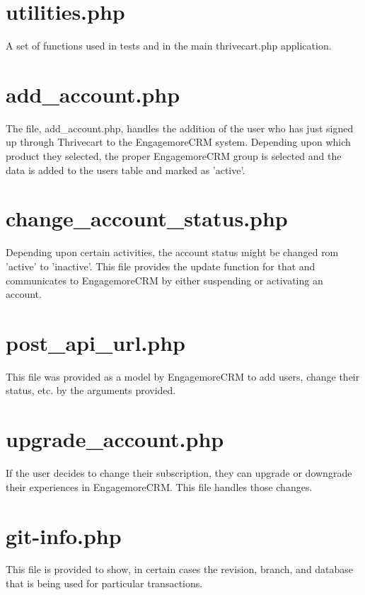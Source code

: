 \documentclass[final,letterpaper,12pt]{article}
\begin{document}
\begin{appendices}


\section{utilities.php}
\noindent A set of functions used in tests and in the main thrivecart.php application.



\section{add\_account.php}
\noindent The file, add\_account.php, handles the addition of the user who has just signed up through Thrivecart to the EngagemoreCRM system.  Depending upon which product they selected, the proper EngagemoreCRM group is selected and the data is added to the users table and marked as 'active'.



\section{change\_account\_status.php}
\noindent Depending upon certain activities, the account status might be changed rom 'active' to 'inactive'.  This file provides the update function for that and communicates to EngagemoreCRM by either suspending or activating an account.



\section{post\_api\_url.php}
\noindent This file was provided as a model by EngagemoreCRM to add users, change their status, etc. by the arguments provided.



\section{upgrade\_account.php}
\noindent If the user decides to change their subscription, they can upgrade or downgrade their experiences in EngagemoreCRM.  This file handles those changes.



\section{git-info.php}
\noindent This file is provided to show, in certain cases the revision, branch, and database that is being used for particular transactions.  



\end{appendices}
\end{document}
